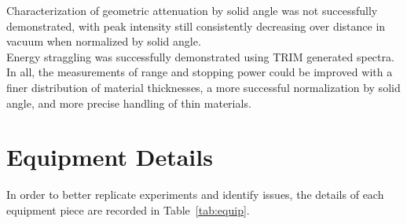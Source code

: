 \documentclass[12pt]{article}
\begin{document}
Characterization of geometric attenuation by solid angle was not successfully demonstrated, with peak intensity still consistently decreasing over distance in vacuum when normalized by solid angle.\\

Energy straggling was successfully demonstrated using TRIM generated spectra.\\

In all, the measurements of range and stopping power could be improved with a finer distribution of material thicknesses, a more successful normalization by solid angle, and more precise handling of thin materials.

% 
\pagebreak\printbibliography

\appendix
\pagebreak
\FloatBarrier\section{Equipment Details}\label{app:equip}
In order to better replicate experiments and identify issues, the details of each equipment piece are recorded in Table~\ref{tab:equip}.
\end{document}

